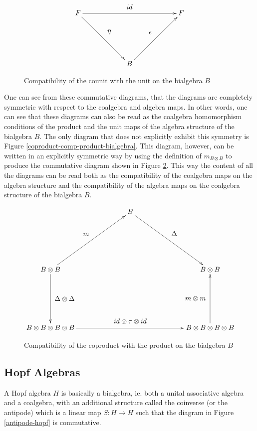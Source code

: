 \begin{figure}[!h]
  \[
  \xymatrix@=60pt{
    F \ar[dr]^-*+{\eta} \ar[rr]^-*+{id} &                         & F  \\
                                        & B \ar[ur]^-*+{\epsilon} & \\
  }
  \]
  \caption{Compatibility of the counit with the unit on the bialgebra $B$}
  \label{counit-comp-unit-bialgebra}
\end{figure}
\pagebreak
One can see from these commutative diagrams, that the diagrams are completely symmetric with
respect to the coalgebra and algebra maps. In other words, one can see that these diagrams
can also be read as the coalgebra homomorphism conditions of the product and the unit maps
of the algebra structure of the bialgebra $B$. The only diagram that does not explicitly exhibit
this symmetry is Figure \ref{coproduct-comp-product-bialgebra}. This diagram, however, can be
written in an explicitly symmetric way by using the definition of $m_{B\otimes B}$ to produce the
commutative diagram shown in Figure \ref{coproduct-comp-product-bialgebra-symm}. This way
the content of all the diagrams can be read both as the compatibility of the coalgebra maps
on the algebra structure and the compatibility of the algebra maps on the coalgebra structure of
the bialgebra $B$.


\begin{figure}[!h]
  \[
  \xymatrix@=70pt{
                                                                   & B  \ar[dr]^-*+{\Delta} & \\
    B \otimes B \ar[ur]^-*+{m} \ar[d]^-*+{\Delta \otimes \Delta}            &  & B \otimes B \\
    B \otimes B \otimes B \otimes B \ar[rr]^-*+{id \otimes \tau \otimes id} &  & B \otimes B \otimes B \otimes B \ar[u]^-*+{m \otimes m}\\
  }
  \]
  \caption{Compatibility of the coproduct with the product on the bialgebra $B$}
  \label{coproduct-comp-product-bialgebra-symm}
\end{figure}




\subsection{Hopf Algebras}


A Hopf algebra $H$ is basically a bialgebra, ie. both a unital associative algebra and a coalgebra, with an additional
structure called the coinverse (or the antipode) which is a linear map $S: H \rightarrow H$
such that the diagram in Figure \ref{antipode-hopf} is commutative.


